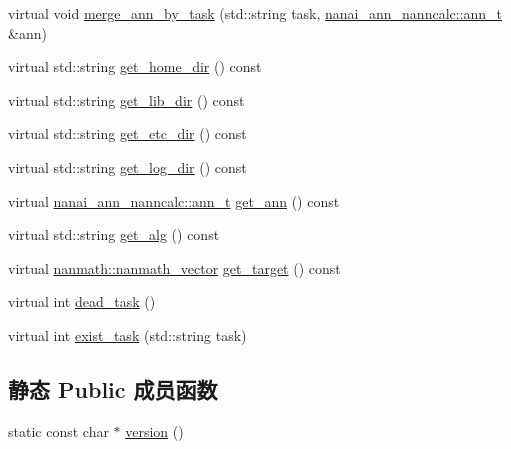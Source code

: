 \begin{DoxyCompactItemize}
\item 
virtual void \hyperlink{classnanai_1_1nanai__ann__nannmgr_aa5d2066f238b5a0724a00c16ddcac6c8}{merge\+\_\+ann\+\_\+by\+\_\+task} (std\+::string task, \hyperlink{classnanai_1_1nanai__ann__nanncalc_1_1ann__t}{nanai\+\_\+ann\+\_\+nanncalc\+::ann\+\_\+t} \&ann)
\item 
virtual std\+::string \hyperlink{classnanai_1_1nanai__ann__nannmgr_a66bb7dacbf2f6484b51e07a221a0d7a9}{get\+\_\+home\+\_\+dir} () const 
\item 
virtual std\+::string \hyperlink{classnanai_1_1nanai__ann__nannmgr_a2dbb53bd1059fe117b032246b7a4ce8c}{get\+\_\+lib\+\_\+dir} () const 
\item 
virtual std\+::string \hyperlink{classnanai_1_1nanai__ann__nannmgr_a9214ed0338f7cf31da855d9ec7513888}{get\+\_\+etc\+\_\+dir} () const 
\item 
virtual std\+::string \hyperlink{classnanai_1_1nanai__ann__nannmgr_ae0a52eacd3eee9d348eb4a6d0751458e}{get\+\_\+log\+\_\+dir} () const 
\item 
virtual \hyperlink{classnanai_1_1nanai__ann__nanncalc_1_1ann__t}{nanai\+\_\+ann\+\_\+nanncalc\+::ann\+\_\+t} \hyperlink{classnanai_1_1nanai__ann__nannmgr_a53c69d19df98df2c6f1cc5f659aaede5}{get\+\_\+ann} () const 
\item 
virtual std\+::string \hyperlink{classnanai_1_1nanai__ann__nannmgr_a07025876ebcdda225dd5e40971a4447d}{get\+\_\+alg} () const 
\item 
virtual \hyperlink{classnanmath_1_1nanmath__vector}{nanmath\+::nanmath\+\_\+vector} \hyperlink{classnanai_1_1nanai__ann__nannmgr_af124a52ff58e98070576a31be93f1b81}{get\+\_\+target} () const 
\item 
virtual int \hyperlink{classnanai_1_1nanai__ann__nannmgr_a5e88711b173c6074539af3a1b32e761d}{dead\+\_\+task} ()
\item 
virtual int \hyperlink{classnanai_1_1nanai__ann__nannmgr_a1cc1df92755308a610a78c1f16e602c0}{exist\+\_\+task} (std\+::string task)
\end{DoxyCompactItemize}
\subsection*{静态 Public 成员函数}
\begin{DoxyCompactItemize}
\item 
static const char $\ast$ \hyperlink{classnanai_1_1nanai__ann__nannmgr_a94024506784918f4808bbe28c4721335}{version} ()
\end{DoxyCompactItemize}
